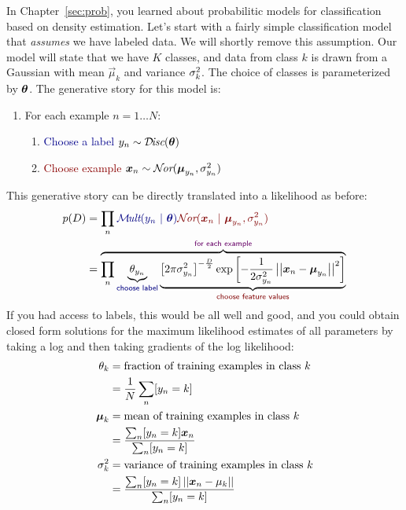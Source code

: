 In Chapter~\ref{sec:prob}, you learned about probabilitic models for
classification based on density estimation.  Let's start with a fairly
simple classification model that \emph{assumes} we have labeled data.
We will shortly remove this assumption.  Our model will state that we
have $K$ classes, and data from class $k$ is drawn from a Gaussian
with mean $\vec\mu_k$ and variance $\sigma^2_k$.  The choice of classes
is parameterized by $\boldsymbol{\theta}$.  The generative story for this model
is:
%
\begin{enumerate}
  \item \textcolor{darkpurple}{For each example} $n = 1 \dots N$:
    \begin{enumerate}
      \item \textcolor{darkblue}{Choose a label} $y_n \sim \mathcal{D}\hspace{-0.5mm}\textit{isc}(\boldsymbol{\theta})$
      \item \textcolor{darkred}{Choose example} ${\boldsymbol{x}}_n \sim \mathcal{N}\hspace{-0.5mm}\textit{or}(\boldsymbol{\mu}_{y_n}, \sigma^2_{y_n})$
     \end{enumerate}
\end{enumerate}
%
This generative story can be directly translated into a likelihood
as before:
%
\begin{align}
  p(D)
  &= \prod_n \textcolor{darkblue}{\Mult(y_n \| \vec\th)} \textcolor{darkred}{\Nor(\vx_n \| \vec\mu_{y_n}, \si^2_{y_n})}\\
  &=  \overbrace{
      \prod_n
       \underbrace{\th_{y_n}}_{\textsf{\textcolor{darkblue}{choose label}}}
         \underbrace{
         \left[2 \pi \si_{y_n}^2\right]^{-\frac D 2}
         \exp\left[
           -\frac 1 {2 \si_{y_n}^2} \norm{\vx_n - \vec\mu_{y_n}}^2
           \right]}_{\textsf{\textcolor{darkred}{choose feature values}}}}
       ^{\textsf{\textcolor{darkpurple}{for each example}}}
\end{align}
%
If you had access to labels, this would be all well and good, and you
could obtain closed form solutions for the maximum likelihood
estimates of all parameters by taking a log and then taking gradients
of the log likelihood:
%
\begin{align}
\theta_k &= \text{fraction of training examples in class $k$} \\
&= \frac 1 N \sum_n [y_n = k] \nonumber\\
\boldsymbol{\mu}_k &= \text{mean of training examples in class $k$} \\
&= \frac {\sum_n [y_n = k] {\boldsymbol{x}}_n} {\sum_n [y_n = k]} \nonumber\\
\sigma^2_k &= \text{variance of training examples in class $k$} \\
&= \frac {\sum_n [y_n = k] \left\vert\left\vert {\boldsymbol{x}}_n-\mu_k \right\vert\right\vert} {\sum_n [y_n = k]} \nonumber
\end{align}
